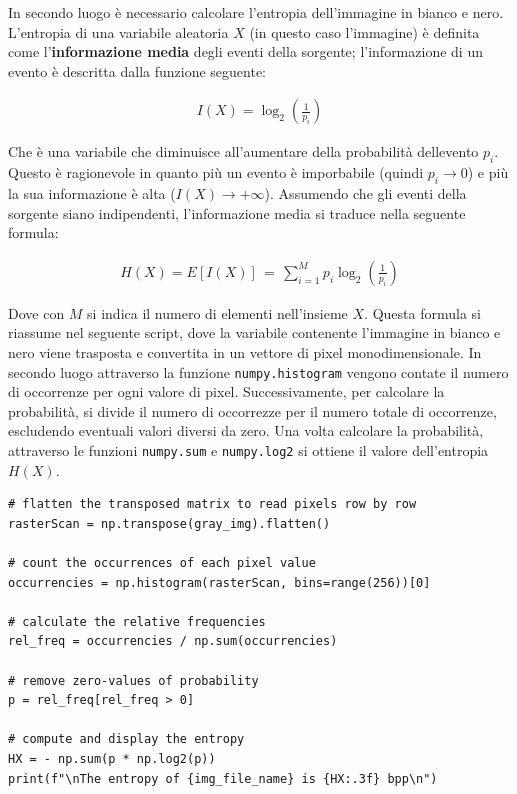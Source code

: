 \FloatBarrier\noindent In secondo luogo è necessario calcolare l'entropia dell'immagine in bianco e nero. L'entropia di una variabile aleatoria $X$ (in questo caso l'immagine) è definita come l'\textbf{informazione media} degli eventi della sorgente; l'informazione di un evento è descritta dalla funzione seguente:

\begin{gather*}
    I(X) = \log_2\left( \frac{1}{p_i} \right)
\end{gather*}

\noindent Che è una variabile che diminuisce all'aumentare della probabilità dellevento $p_i$. Questo è ragionevole in quanto più un evento è imporbabile (quindi $p_i \to 0$) e più la sua informazione è alta ($I(X) \to +\infty$). Assumendo che gli eventi della sorgente siano indipendenti, l'informazione media si traduce nella seguente formula:

\begin{gather*}
    H(X) = E[I(X)] \, = \, \sum_{i = 1}^M p_i\log_2\left( \frac{1}{p_i} \right)
\end{gather*}

\noindent Dove con $M$ si indica il numero di elementi nell'insieme $X$. Questa formula si riassume nel seguente script, dove la variabile contenente l'immagine in bianco e nero viene trasposta e convertita in un vettore di pixel monodimensionale. In secondo luogo attraverso la funzione \texttt{numpy.histogram} vengono contate il numero di occorrenze per ogni valore di pixel. Successivamente, per calcolare la probabilità, si divide il numero di occorrezze per il numero totale di occorrenze, escludendo eventuali valori diversi da zero. Una volta calcolare la probabilità, attraverso le funzioni  \texttt{numpy.sum} e \texttt{numpy.log2} si ottiene il valore dell'entropia $H(X)$.


\begin{lstlisting}
# flatten the transposed matrix to read pixels row by row
rasterScan = np.transpose(gray_img).flatten()

# count the occurrences of each pixel value
occurrencies = np.histogram(rasterScan, bins=range(256))[0]

# calculate the relative frequencies
rel_freq = occurrencies / np.sum(occurrencies)

# remove zero-values of probability
p = rel_freq[rel_freq > 0]

# compute and display the entropy
HX = - np.sum(p * np.log2(p))
print(f"\nThe entropy of {img_file_name} is {HX:.3f} bpp\n")
\end{lstlisting}

